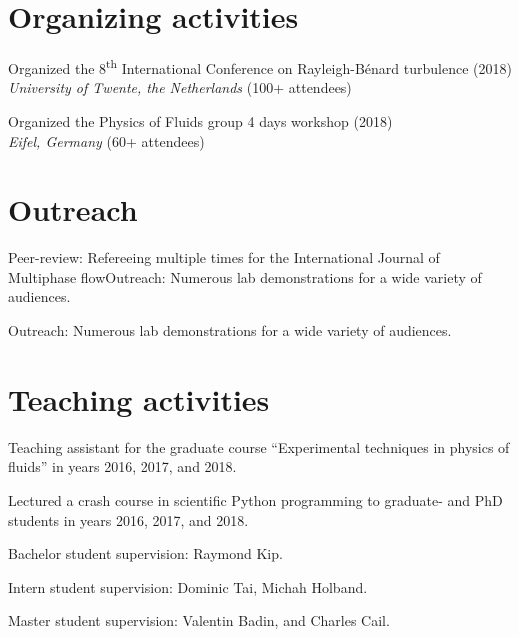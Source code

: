 \section*{Organizing activities}
\begin{packeditemize}
\item Organized the 8\textsuperscript{th} International Conference on
    Rayleigh-B\'enard turbulence (2018) \\
    \textit{University of Twente, the Netherlands} (100+ attendees)
\item Organized the Physics of Fluids group 4 days workshop (2018) \\
    \textit{Eifel, Germany} (60+ attendees)
\end{packeditemize}

\section*{Outreach}
\begin{packeditemize}
\item Peer-review: Refereeing multiple times for the International Journal of Multiphase
    flowOutreach: Numerous lab demonstrations for a wide variety of audiences.
\item Outreach: Numerous lab demonstrations for a wide variety of audiences.
\end{packeditemize}

\section*{Teaching activities}
\begin{packeditemize}
\item Teaching assistant for the graduate course ``Experimental techniques in
    physics of fluids'' in years 2016, 2017, and 2018.
\item Lectured a crash course in scientific Python programming to graduate-
    and PhD students in years 2016, 2017, and 2018.
\item Bachelor student supervision: Raymond Kip.
\item Intern student supervision: Dominic Tai, Michah Holband.
\item Master student supervision: Valentin Badin, and Charles Cail.
\end{packeditemize}


